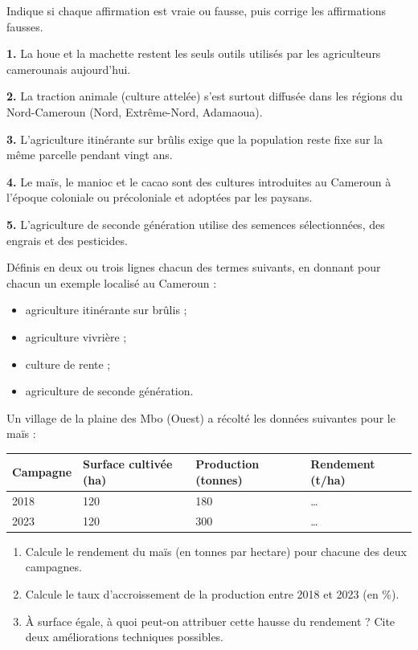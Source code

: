 \documentclass[11pt]{article}
\begin{document}
\begin{exercice}
Indique si chaque affirmation est vraie ou fausse, puis corrige les affirmations fausses.

\textbf{1.} La houe et la machette restent les seuls outils utilisés par les agriculteurs camerounais aujourd'hui.

\textbf{2.} La traction animale (culture attelée) s'est surtout diffusée dans les régions du Nord-Cameroun (Nord, Extrême-Nord, Adamaoua).

\textbf{3.} L'agriculture itinérante sur brûlis exige que la population reste fixe sur la même parcelle pendant vingt ans.

\textbf{4.} Le maïs, le manioc et le cacao sont des cultures introduites au Cameroun à l'époque coloniale ou précoloniale et adoptées par les paysans.

\textbf{5.} L'agriculture de seconde génération utilise des semences sélectionnées, des engrais et des pesticides.
\end{exercice}

\begin{exercice}
Définis en deux ou trois lignes chacun des termes suivants, en donnant pour chacun un exemple localisé au Cameroun :
\begin{itemize}
\item agriculture itinérante sur brûlis ;
\item agriculture vivrière ;
\item culture de rente ;
\item agriculture de seconde génération.
\end{itemize}
\end{exercice}

\begin{exercice}
Un village de la plaine des Mbo (Ouest) a récolté les données suivantes pour le maïs :

\begin{center}
\begin{tabularx}{\linewidth}{|l|X|X|X|}\hline
\rowcolor{popblueL} Campagne & Surface cultivée (ha) & Production (tonnes) & Rendement (t/ha) \\ \hline
2018 & 120 & 180 & \ldots \\ \hline
2023 & 120 & 300 & \ldots \\ \hline
\end{tabularx}
\end{center}

\begin{enumerate}
\item Calcule le rendement du maïs (en tonnes par hectare) pour chacune des deux campagnes.
\item Calcule le taux d'accroissement de la production entre 2018 et 2023 (en \%).
\item À surface égale, à quoi peut-on attribuer cette hausse du rendement ? Cite deux améliorations techniques possibles.
\end{enumerate}
\end{exercice}
\end{document}
